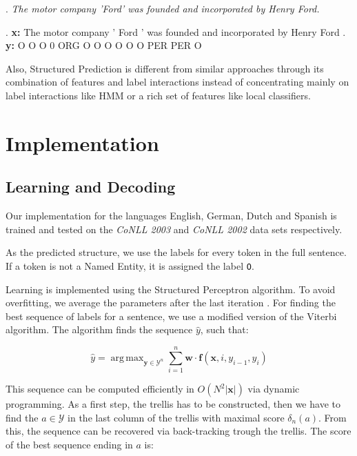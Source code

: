 \documentclass[11pt]{article}
\DeclareMathOperator*{\argmax}{arg\,max}
\newcommand{\namedentity}{Named Entity}
\newcommand{\Oo}{\texttt O}
\begin{document}
\begin{figure*}[ht]

\ex. \emph{The motor company 'Ford' was founded and incorporated  by Henry Ford.} \label{PredEx1a}
 
\exg. \textbf{x:} The motor company ' Ford ' was founded and incorporated by Henry Ford .\\
      \textbf{y:}  O   O      O     0 ORG  O  O     O     O       O        O PER   PER  O  \label{PredEx1b} \\
\caption{Input and predicted structure for the Named Entity task.}

\end{figure*}

Also, Structured Prediction is different from similar approaches through its combination of features and label interactions instead
of concentrating mainly on label interactions like HMM or a rich set of features like local classifiers. 

\section{Implementation}

\subsection{Learning and Decoding}

Our implementation for the languages English, German, Dutch and Spanish is trained and tested on the \emph{CoNLL 2003} and \emph{CoNLL 2002} data sets respectively. 

As the predicted structure, we use the labels for every token in the full sentence. If a token is not a \namedentity, it is assigned the label \Oo.

Learning is implemented using the Structured Perceptron algorithm. To avoid overfitting, we average the parameters after the last iteration \cite{collins2002discriminative}. For finding the best sequence of labels for a sentence, we use a modified version of the Viterbi algorithm. The algorithm finds the sequence $\hat{y}$, such that:

\[
\hat{y} = \argmax_{\mathbf{y} \in \mathcal{Y}^{n}} \sum_{i=1}^{n}\mathbf{w} \cdot \boldsymbol{f}(\mathbf{x}, i, y_{i-1}, y_{i})
\]

This sequence can be computed efficiently in $ O( N^2 |\mathbf{x}| ) $ via dynamic programming. 
As a first step, the trellis has to be constructed, then we have to find the $ a \in \mathcal{Y}$ in the 
last column of the trellis with maximal score $\delta_n(a)$. From this, the sequence can be recovered via back-tracking trough the trellis. 
The score of the best sequence ending in $a$ is:
\end{document}
